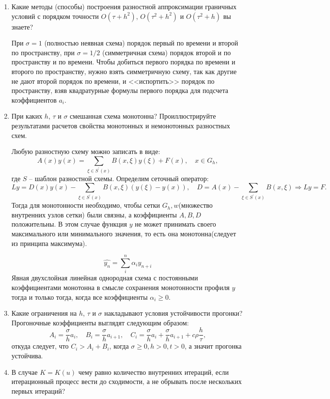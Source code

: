 \documentclass[12pt, a4paper]{article}
\begin{document}
\begin{enumerate}
\item Какие методы (способы) построения разностной аппроксимации граничных условий с порядком точности $O(\tau + h^2)$, $O(\tau^2 +h^2)$ и $O(\tau^2 + h)$ вы знаете?

При $\sigma = 1$ (полностью неявная схема) порядок первый по времени и второй по пространству, при $\sigma  = 1/2$ (симметричная схема) порядок второй и по пространству и по времени. Чтобы добиться первого порядка по времени и второго по пространству, нужно взять симметричную схему, так как другие не дают второй порядок по времени, и <<испортить>> порядок по пространству, взяв квадратурные формулы первого порядка для подсчета коэффициентов $a_i$.

\item При каких $h$, $\tau$ и $\sigma$ смешанная схема монотонна? Проиллюстрируйте результатами расчетов свойства монотонных и немонотонных разностных схем.

Любую разностную схему можно записать в виде:
\[
  A(x)y(x) = \displaystyle\sum_{\xi \in S^'(x)} B(x, \xi)y(\xi) + F(x), \quad x\in G_h,
\]
\noindent где $S$ -- шаблон разностной схемы. Определим сеточный оператор:
\[
  Ly = D(x)y(x) - \displaystyle\sum_{\xi \in S^'(x)} B(x, \xi)(y(\xi) - y(x)), \quad D = A(x) - \displaystyle\sum_{\xi \in S^'(x)} B(x, \xi) \Rightarrow Ly = F.
\]
Тогда для монотонности необходимо, чтобы сетки $G_h, w$(множество внутренних узлов сетки) были связны, а коэффициенты $A, B, D$ положительны. В этом случае функция $y$ не может принимать своего максимального или минимального значения, то есть она монотонна(следует из принципа максимума).

\[
\hat{y_n} = \sum_{i}^{n}{\alpha_i y_{n+i}}
\]
Явная двухслойная линейная однородная схема с постоянными коэффициентами монотонна в смысле сохранения монотонности профиля $y$ тогда и только тогда, когда все коэффициенты $\alpha_i \geq 0$.

\item Какие ограничения на $h$, $\tau$ и $\sigma$ накладывают условия устойчивости прогонки?
Прогоночные коэффициенты выглядят следующим образом:
\[
    A_i = \dfrac{\sigma}{h}a_i, \quad B_i = \dfrac{\sigma}{h}a_{i+1}, \quad C_i = \dfrac{\sigma}{h}a_i + \dfrac{\sigma}{h}a_{i+1} + c \rho \dfrac{h}{\tau},
\]
\noindent откуда следует, что $ C_i > A_i + B_i $, когда $ \sigma \geq 0, h > 0, t > 0 $, а значит прогонка устойчива.

\item В случае $K=K(u)$ чему равно количество внутренних итераций, если итерационный процесс вести до сходимости, а не обрывать после нескольких первых итераций?


\end{enumerate}
\end{document}
